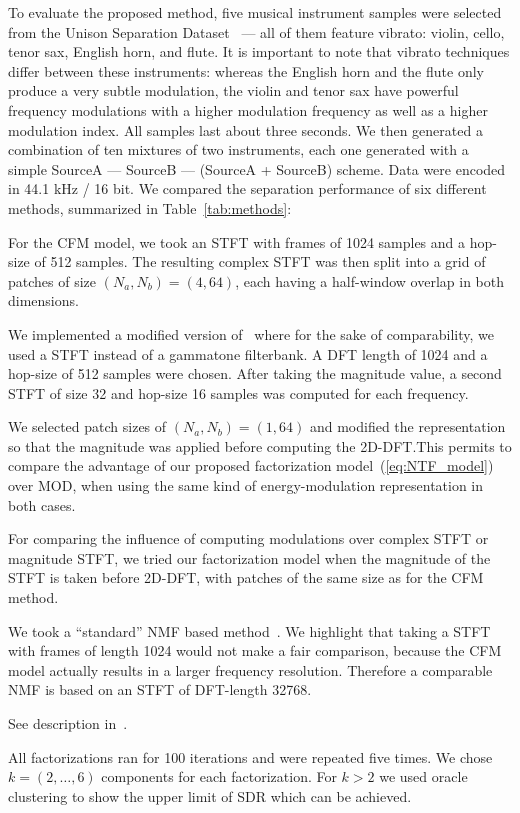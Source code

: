 To evaluate the proposed method, five musical instrument samples were selected from the Unison Separation Dataset~\cite{oss_unison} --- all of them feature vibrato: violin, cello, tenor sax, English horn, and flute. It is important to note that vibrato techniques differ between these instruments: whereas the English horn and the flute only produce a very subtle modulation, the violin and tenor sax have powerful frequency modulations with a higher modulation frequency as well as a higher modulation index. 
All samples last about three seconds. 
We then generated a combination of ten mixtures of two instruments, each one generated with a simple SourceA --- SourceB --- (SourceA + SourceB) scheme. Data were encoded in 44.1 kHz / 16 bit.
We compared the separation performance of six different methods, summarized in Table~\ref{tab:methods}:
\begin{description}[style=unboxed,leftmargin=0cm]
\item[CFM] For the CFM model, we took an STFT with frames of 1024 samples and a hop-size of 512 samples. The resulting complex STFT was then split into a grid of patches of size $(N_a, N_b) = (4, 64)$, each having a half-window overlap in both dimensions.
\item[MOD] We implemented a modified version of~\cite{barker13} where for the sake of comparability, we used a STFT instead of a gammatone filterbank. A DFT length of 1024 and a hop-size of 512 samples were chosen. After taking the magnitude value, a second STFT of size 32 and hop-size 16 samples was computed for each frequency.
\item[CFMMOD] We selected patch sizes of $(N_a, N_b) = (1, 64)$ and modified the representation so that the magnitude was applied before computing the 2D-DFT.\@ This permits to compare the advantage of our proposed factorization model~(\ref{eq:NTF_model}) over MOD, when using the same kind of energy-modulation representation in both cases.
\item[CFMM] For comparing the influence of computing modulations over complex STFT or magnitude STFT, we tried our factorization model when the magnitude of the STFT is taken before 2D-DFT, with patches of the same size as for the CFM method.
\item[NMF] We took a ``standard'' NMF based method~\cite{virtanen07}. We highlight that taking a STFT with frames of length 1024 would not make a fair comparison, because the CFM model actually results in a larger frequency resolution. Therefore a comparable NMF is based on an STFT of DFT-length 32768.
\item[HR-NMF] See description in~\cite{magron15a}.
\end{description}
All factorizations ran for 100 iterations and were repeated five times. We chose $k=(2,\ldots,6)$ components for each factorization. For $k > 2$ we used oracle clustering to show the upper limit of SDR which can be achieved.

